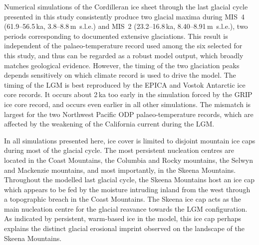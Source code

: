 \documentclass[tc, manuscript]{copernicus}
\begin{document}
\conclusions
\label{sec:concl}

Numerical simulations of the Cordilleran ice sheet through the last glacial
cycle presented in this study consistently produce two glacial maxima during
MIS~4 (61.9--56.5\,ka, 3.8--8.8\,m~s.l.e.) and MIS~2 (23.2--16.8\,ka,
8.40--8.91\,m~s.l.e.), two periods corresponding to documented extensive
glaciations. This result is independent of the palaeo-temperature record used
among the six selected for this study, and thus can be regarded as a robust model
output, which broadly matches geological evidence. However, the timing of the
two glaciation peaks depends sensitively on which climate record is used to
drive the model. The timing of the LGM is best reproduced by the EPICA and
Vostok Antarctic ice core records. It occurs about 2\,ka too early in the
simulation forced by the GRIP ice core record, and occurs even earlier in all other
simulations. The mismatch is largest for the two Northwest Pacific ODP
palaeo-temperature records, which are affected by the weakening of the
California current during the LGM.

In all simulations presented here, ice cover is limited to disjoint mountain
ice caps during most of the glacial cycle. The most persistent nucleation
centres are located in the Coast Mountains, the Columbia and Rocky mountains,
the Selwyn and Mackenzie mountains, and most importantly, in the Skeena
Mountains. Throughout the modelled last glacial cycle, the Skeena Mountains
host an ice cap which appears to be fed by the moisture intruding inland from the
west through a topographic breach in the Coast Mountains. The Skeena ice cap acts
as the main nucleation centre for the glacial reavance towards the LGM
configuration. As indicated
by persistent, warm-based ice in the model, this ice cap perhaps explains
the distinct glacial erosional imprint observed on the landscape of the Skeena
Mountains.
\end{document}
